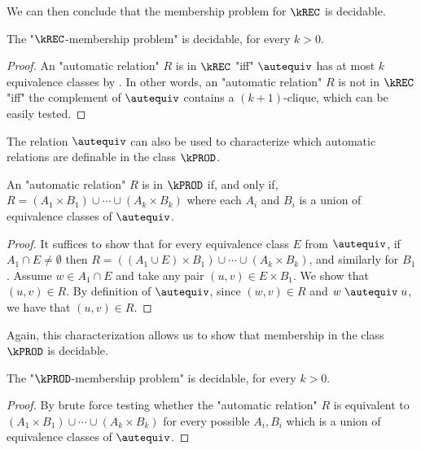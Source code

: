 We can then conclude that the membership problem for $\kREC$ is decidable. 

\begin{corollary}
    The "$\kREC$-membership problem" is decidable, for every $k > 0$.
\end{corollary}
\begin{proof}
    An "automatic relation" $R$ is in $\kREC$ "iff" $\autequiv$ has at most $k$ equivalence classes by . 
    In other words, an "automatic relation" $R$ is not in $\kREC$ "iff" the complement of $\autequiv$ contains a $(k+1)$-clique, which can be easily tested.
\end{proof}

The relation $\autequiv$ can also be used to characterize which automatic relations are definable in the class $\kPROD$.

\begin{lemma}
    An "automatic relation" $R$ is in $\kPROD$ if, and only if, $R=(A_1 \times B_1) \cup \dotsb \cup (A_k \times B_k)$ where each $A_i$ and $B_i$ is a union of equivalence classes of $\autequiv$.
\end{lemma}
\begin{proof}
    It suffices to show that for every equivalence class $E$ from $\autequiv$, if $A_1 \cap E \neq \emptyset$ then $R = ((A_1 \cup E) \times B_1) \cup \dotsb \cup (A_k \times B_k)$, and similarly for $B_1$. Assume $w \in A_1 \cap E$ and take any pair $(u,v) \in E \times B_1$. We show that $(u,v) \in R$. By definition of $\autequiv$, since $(w,v) \in R$ and $w \mathrel{\autequiv} u$, we have that $(u,v) \in R$.
\end{proof}

Again, this characterization allows us to show that membership in the class $\kPROD$ is decidable. 

\begin{corollary}
    The "$\kPROD$-membership problem" is decidable, for every $k > 0$.
\end{corollary}

\begin{proof}
    By brute force testing whether the "automatic relation" $R$ is equivalent to $(A_1 \times B_1) \cup \dotsb \cup (A_k \times B_k)$ for every possible $A_i,B_i$ which is a union of equivalence classes of $\autequiv$.
\end{proof}
